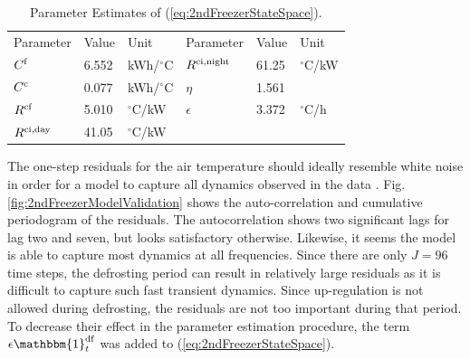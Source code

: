 \documentclass[11pt,a4paper]{article}
\begin{document}
\begin{table}[!t]
    \caption{Parameter Estimates of (\ref{eq:2ndFreezerStateSpace}).}
    \label{tab:parameter_estimates}
    \centering
    \begin{tabular}[b]{|l|l|l||l|l|l|}
        \hline
        Parameter                 & Value & Unit            & Parameter                   & Value & Unit           \\ \hhline{|=|=|=|=|=|=|}
        $C^{\rm{f}}$              & 6.552 & kWh/$^{\circ}$C & $R^{\rm{ci}, \text{night}}$ & 61.25 & $^{\circ}$C/kW \\
        $C^{\rm{c}}$              & 0.077 & kWh/$^{\circ}$C & $\eta$                      & 1.561 &                \\
        $R^{\rm{cf}}$             & 5.010 & $^{\circ}$C/kW  & $\epsilon$                  & 3.372 & $^{\circ}$C/h  \\
        $R^{\rm{ci}, \text{day}}$ & 41.05 & $^{\circ}$C/kW  &                             &       &                \\ \hline
    \end{tabular}
\end{table}





The one-step residuals for the air temperature should ideally resemble white noise in order for a model to capture all dynamics observed in the data \cite{madsen2007time}. Fig. \ref{fig:2ndFreezerModelValidation} shows the auto-correlation and cumulative periodogram of the residuals. The autocorrelation shows two significant lags for lag two and seven, but looks satisfactory otherwise. Likewise,  it seems the model is able to capture most dynamics at all frequencies.
%
Since there are only $J = 96$ time steps, the defrosting period can result in relatively large residuals as it is difficult to capture such fast transient dynamics. Since up-regulation is not allowed during defrosting, the residuals are not too important during that period. To decrease their effect in the parameter estimation procedure, the term $ \epsilon \mathbbm{1}^{\rm{df}}_{t}$ was added to (\ref{eq:2ndFreezerStateSpace}).
\end{document}
